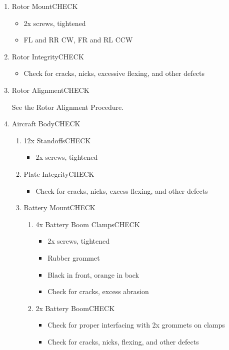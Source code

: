 \documentclass{report}
\begin{document}
\begin{enumerate}
			\item Rotor Mount\hrulefill CHECK
				\begin{itemize}
					\item 2x screws, tightened
					\item FL and RR CW, FR and RL CCW
				\end{itemize}
			\item Rotor Integrity\hrulefill CHECK
				\begin{itemize}
					\item Check for cracks, nicks, excessive flexing, and other defects
				\end{itemize}
			\item Rotor Alignment\hrulefill CHECK

				See the Rotor Alignment Procedure.
			\item Aircraft Body\hrulefill CHECK
				\begin{enumerate}
					\item 12x Standoffs\hrulefill CHECK
						\begin{itemize}
							\item 2x screws, tightened
						\end{itemize}
					\item Plate Integrity\hrulefill CHECK
						\begin{itemize}
							\item Check for cracks, nicks, excess flexing, and other defects
						\end{itemize}
					\item Battery Mount\hrulefill CHECK
						\begin{enumerate}
							\item 4x Battery Boom Clamps\hrulefill CHECK
								\begin{itemize}
									\item 2x screws, tightened
									\item Rubber grommet
									\item Black in front, orange in back
									\item Check for cracks, excess abrasion
								\end{itemize}
							\item 2x Battery Boom\hrulefill CHECK
								\begin{itemize}
									\item Check for proper interfacing with 2x grommets on clamps
									\item Check for cracks, nicks, flexing, and other defects

\end{itemize}
\end{enumerate}
\end{enumerate}
\end{enumerate}
\end{document}
